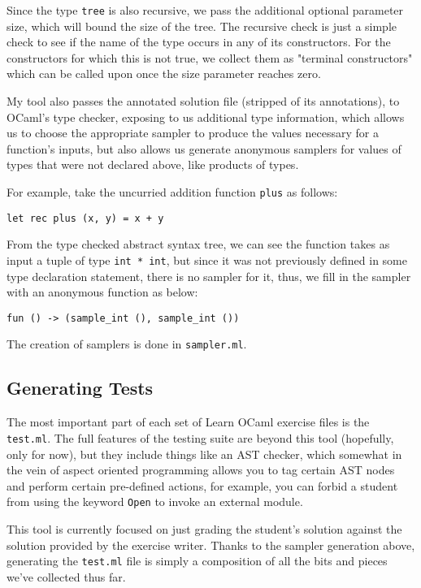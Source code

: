 \documentclass[11pt]{article}
\begin{document}
Since the type \verb+tree+ is also recursive, we pass the additional optional parameter size, which will bound the size of the tree. The recursive check is just a simple check to see if the name of the type occurs in any of its constructors. For the constructors for which this is not true, we collect them as "terminal constructors" which can be called upon once the size parameter reaches zero.

My tool also passes the annotated solution file (stripped of its annotations), to OCaml's type checker, exposing to us additional type information, which allows us to choose the appropriate sampler to produce the values necessary for a function's inputs, but also allows us generate anonymous samplers for values of types that were not declared above, like products of types.

For example, take the uncurried addition function \verb+plus+ as follows:
\begin{lstlisting}
let rec plus (x, y) = x + y
\end{lstlisting}

From the type checked abstract syntax tree, we can see the function takes as input a tuple of type \verb+int * int+, but since it was not previously defined in some type declaration statement, there is no sampler for it, thus, we fill in the sampler with an anonymous function as below:

\begin{lstlisting}
fun () -> (sample_int (), sample_int ())
\end{lstlisting}

The creation of samplers is done in \verb+sampler.ml+.

\subsection{Generating Tests}
The most important part of each set of Learn OCaml exercise files is the \verb+test.ml+. The full features of the testing suite are beyond this tool (hopefully, only for now), but they include things like an AST checker, which somewhat in the vein of aspect oriented programming allows you to tag certain AST nodes and perform certain pre-defined actions, for example, you can forbid a student from using the keyword \verb+Open+ to invoke an external module.

This tool is currently focused on just grading the student's solution against the solution provided by the exercise writer. Thanks to the sampler generation above, generating the \verb+test.ml+ file is simply a composition of all the bits and pieces we've collected thus far.
\end{document}
